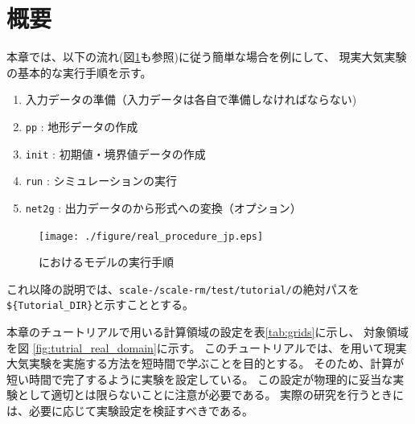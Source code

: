 \section{概要} \label{sec:tutrial_real_intro}
本章では、以下の流れ(図\ref{fig:howto}も参照)に従う簡単な場合を例にして、
現実大気実験の基本的な実行手順を示す。
\begin{enumerate}
\item  入力データの準備（入力データは各自で準備しなければならない)
\item  \texttt{pp}      : 地形データの作成
\item  \texttt{init}    : 初期値・境界値データの作成
\item  \texttt{run}     : シミュレーションの実行
\item  \texttt{net2g}   : 出力データの\netcdf から\grads 形式への変換（オプション）
\end{enumerate}

\begin{figure}[b]
\begin{center}
  \texttt{[image: ./figure/real\_procedure\_jp.eps]}\\
  \caption{\scalerm におけるモデルの実行手順}
  \label{fig:howto}
\end{center}
\end{figure}


これ以降の説明では、\texttt{scale-{\version}/scale-rm/test/tutorial/}の絶対パスを
\verb|${Tutorial_DIR}|と示すこととする。


本章のチュートリアルで用いる計算領域の設定を表\ref{tab:grids}に示し、
対象領域を図 \ref{fig:tutrial_real_domain}に示す。
このチュートリアルでは、\scalerm を用いて現実大気実験を実施する方法を短時間で学ぶことを目的とする。
そのため、計算が短い時間で完了するように実験を設定している。
この設定が物理的に妥当な実験として適切とは限らないことに注意が必要である。
実際の研究を行うときには、必要に応じて実験設定を検証すべきである。



